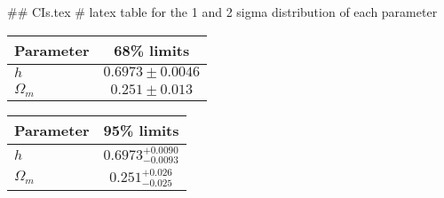 ## CIs.tex
# latex table for the 1 and 2 sigma distribution of each parameter

\begin{tabular} { l  c}
 Parameter &  68\% limits\\
\hline
{\boldmath$h              $} & $0.6973\pm 0.0046          $\\
{\boldmath$\Omega_m       $} & $0.251\pm 0.013            $\\
\hline
\end{tabular}

\begin{tabular} { l  c}
 Parameter &  95\% limits\\
\hline
{\boldmath$h              $} & $0.6973^{+0.0090}_{-0.0093}$\\
{\boldmath$\Omega_m       $} & $0.251^{+0.026}_{-0.025}   $\\
\hline
\end{tabular}
